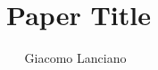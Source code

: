 \documentclass[a4paper,10pt,twocolumn]{article}
\title{
    Paper Title
}
\author{Giacomo Lanciano~\orcidlink{0000-0002-7431-8041}}
\begin{document}
\maketitle

\begin{abstract}
    
\end{abstract}









%

\end{document}
